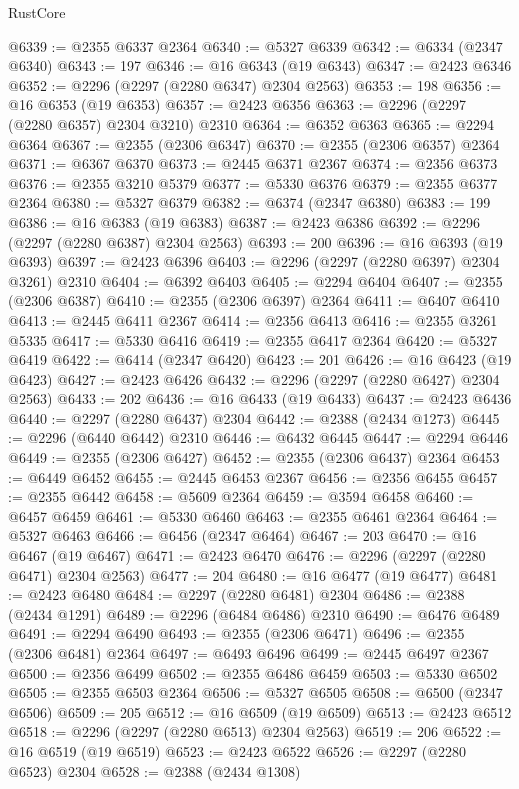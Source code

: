 \begin{lexlean}{RustCore}
\begin{coremodule}
@6339 := @2355 @6337 @2364
@6340 := @5327 @6339
@6342 := @6334 (@2347 @6340)
@6343 := 197
@6346 := @16 @6343 (@19 @6343)
@6347 := @2423 @6346
@6352 := @2296 (@2297 (@2280 @6347) @2304 @2563)
@6353 := 198
@6356 := @16 @6353 (@19 @6353)
@6357 := @2423 @6356
@6363 := @2296 (@2297 (@2280 @6357) @2304 @3210) @2310
@6364 := @6352 @6363
@6365 := @2294 @6364
@6367 := @2355 (@2306 @6347)
@6370 := @2355 (@2306 @6357) @2364
@6371 := @6367 @6370
@6373 := @2445 @6371 @2367
@6374 := @2356 @6373
@6376 := @2355 @3210 @5379
@6377 := @5330 @6376
@6379 := @2355 @6377 @2364
@6380 := @5327 @6379
@6382 := @6374 (@2347 @6380)
@6383 := 199
@6386 := @16 @6383 (@19 @6383)
@6387 := @2423 @6386
@6392 := @2296 (@2297 (@2280 @6387) @2304 @2563)
@6393 := 200
@6396 := @16 @6393 (@19 @6393)
@6397 := @2423 @6396
@6403 := @2296 (@2297 (@2280 @6397) @2304 @3261) @2310
@6404 := @6392 @6403
@6405 := @2294 @6404
@6407 := @2355 (@2306 @6387)
@6410 := @2355 (@2306 @6397) @2364
@6411 := @6407 @6410
@6413 := @2445 @6411 @2367
@6414 := @2356 @6413
@6416 := @2355 @3261 @5335
@6417 := @5330 @6416
@6419 := @2355 @6417 @2364
@6420 := @5327 @6419
@6422 := @6414 (@2347 @6420)
@6423 := 201
@6426 := @16 @6423 (@19 @6423)
@6427 := @2423 @6426
@6432 := @2296 (@2297 (@2280 @6427) @2304 @2563)
@6433 := 202
@6436 := @16 @6433 (@19 @6433)
@6437 := @2423 @6436
@6440 := @2297 (@2280 @6437) @2304
@6442 := @2388 (@2434 @1273)
@6445 := @2296 (@6440 @6442) @2310
@6446 := @6432 @6445
@6447 := @2294 @6446
@6449 := @2355 (@2306 @6427)
@6452 := @2355 (@2306 @6437) @2364
@6453 := @6449 @6452
@6455 := @2445 @6453 @2367
@6456 := @2356 @6455
@6457 := @2355 @6442
@6458 := @5609 @2364
@6459 := @3594 @6458
@6460 := @6457 @6459
@6461 := @5330 @6460
@6463 := @2355 @6461 @2364
@6464 := @5327 @6463
@6466 := @6456 (@2347 @6464)
@6467 := 203
@6470 := @16 @6467 (@19 @6467)
@6471 := @2423 @6470
@6476 := @2296 (@2297 (@2280 @6471) @2304 @2563)
@6477 := 204
@6480 := @16 @6477 (@19 @6477)
@6481 := @2423 @6480
@6484 := @2297 (@2280 @6481) @2304
@6486 := @2388 (@2434 @1291)
@6489 := @2296 (@6484 @6486) @2310
@6490 := @6476 @6489
@6491 := @2294 @6490
@6493 := @2355 (@2306 @6471)
@6496 := @2355 (@2306 @6481) @2364
@6497 := @6493 @6496
@6499 := @2445 @6497 @2367
@6500 := @2356 @6499
@6502 := @2355 @6486 @6459
@6503 := @5330 @6502
@6505 := @2355 @6503 @2364
@6506 := @5327 @6505
@6508 := @6500 (@2347 @6506)
@6509 := 205
@6512 := @16 @6509 (@19 @6509)
@6513 := @2423 @6512
@6518 := @2296 (@2297 (@2280 @6513) @2304 @2563)
@6519 := 206
@6522 := @16 @6519 (@19 @6519)
@6523 := @2423 @6522
@6526 := @2297 (@2280 @6523) @2304
@6528 := @2388 (@2434 @1308)

\end{coremodule}
\end{lexlean}
